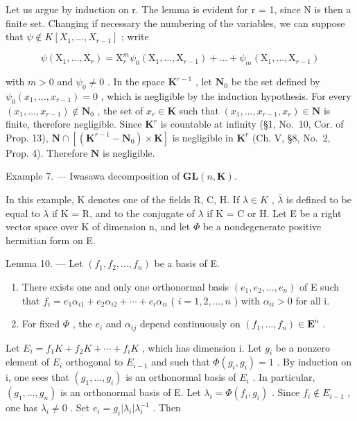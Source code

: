 Let us argue by induction on r. The lemma is evident for r = 1, since N is then a finite set. Changing if necessary the numbering of the variables, we can suppose that \(\psi \notin K[X_{1}, \ldots, X_{r-1}]\) ; write

\[
\psi \left(\mathrm{X} _ {1}, \dots , \mathrm{X} _ {r}\right) = \mathrm{X} _ {r} ^ {m} \psi_ {0} \left(\mathrm{X} _ {1}, \dots , \mathrm{X} _ {r - 1}\right) + \dots + \psi_ {m} \left(\mathrm{X} _ {1}, \dots , \mathrm{X} _ {r - 1}\right)
\]

with \(m > 0\) and \(\psi_0 \neq 0\) . In the space \(\mathbf{K}^{r-1}\) , let \(\mathbf{N}_0\) be the set defined by \(\psi_0(x_1, \ldots, x_{r-1}) = 0\) , which is negligible by the induction hypothesis. For every \((x_1, \ldots, x_{r-1}) \notin \mathbf{N}_0\) , the set of \(x_r \in \mathbf{K}\) such that \((x_1, \ldots, x_{r-1}, x_r) \in \mathbf{N}\) is finite, therefore negligible. Since \(\mathbf{K}^r\) is countable at infinity (§1, No.~10, Cor. of Prop. 13), \(\mathbf{N} \cap [(\mathbf{K}^{r-1} - \mathbf{N}_0) \times \mathbf{K}]\) is negligible in \(\mathbf{K}^r\) (Ch. V, §8, No.~2, Prop. 4). Therefore \(\mathbf{N}\) is negligible.

Example 7. --- Iwasawa decomposition of \(\mathbf{GL}(n,\mathbf{K})\).

In this example, K denotes one of the fields R, C, H. If \(\lambda \in K\) , \(\overline{\lambda}\) is defined to be equal to \(\lambda\) if K = R, and to the conjugate of \(\lambda\) if K = C or H. Let E be a right vector space over K of dimension n, and let \(\Phi\) be a nondegenerate positive hermitian form on E.

Lemma 10. --- Let \((f_1, f_2, \ldots, f_n)\) be a basis of E.

\begin{enumerate}
\def\labelenumi{\alph{enumi})}
\item
  There exists one and only one orthonormal basis \((e_{1}, e_{2}, \ldots, e_{n})\) of E such that \(f_{i} = e_{1}\alpha_{i1} + e_{2}\alpha_{i2} + \cdots + e_{i}\alpha_{ii}\) ( \(i = 1, 2, \ldots, n\) ) with \(\alpha_{ii} > 0\) for all i.
\item
  For fixed \(\Phi\) , the \(e_i\) and \(\alpha_{ij}\) depend continuously on \((f_1, \ldots, f_n) \in \mathbf{E}^n\) .
\end{enumerate}

Let \(E_{i}=f_{1}K+f_{2}K+\cdots+f_{i}K\) , which has dimension i. Let \(g_{i}\) be a nonzero element of \(E_{i}\) orthogonal to \(E_{i-1}\) and such that \(\Phi(g_{i},g_{i})=1\) . By induction on i, one sees that \((g_{1},\ldots,g_{i})\) is an orthonormal basis of \(E_{i}\) . In particular, \((g_{1},\ldots,g_{n})\) is an orthonormal basis of E. Let \(\lambda_{i}=\Phi(f_{i},g_{i})\) . Since \(f_{i}\notin E_{i-1}\) , one has \(\lambda_{i}\neq0\) . Set \(e_{i}=g_{i}\left|\lambda_{i}\right|\lambda_{i}^{-1}\) . Then

